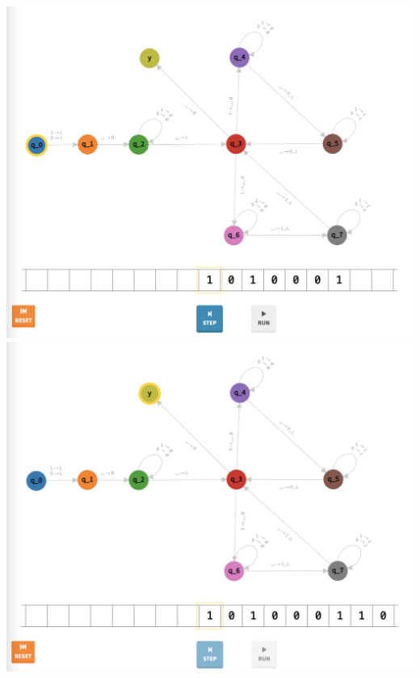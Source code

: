 \documentclass[a4paper]{article}
\begin{document}
\begin{center}
\includegraphics[width=\textwidth]{TM2.11}
\includegraphics[width=\textwidth]{TM2.12}
\end{center}
\newpage
\end{document}
